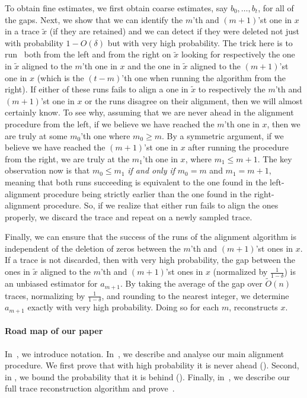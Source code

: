 \documentclass[12pt]{article}
\theoremstyle{definition}
\theoremstyle{remark}
\begin{document}
To obtain fine estimates, we first obtain coarse estimates, say $b_0,\dots, b_t$, for all of the gaps. Next, we show that we can identify the $m$'th and $(m+1)$'st one in $x$ in a trace $\tilde x$ (if they are retained) and we can detect if they were deleted not just with probability $1-O(\delta)$ but with very high probability. The trick here is to run~ both from the left and from the right on $\tilde x$ looking for respectively the one in $\tilde x$ aligned to the $m$'th one in $x$ and the one in $\tilde x$ aligned to the $(m+1)$'st one in $x$ (which is the $(t-m)$'th one when running the algorithm from the right). If either of these runs fails to align a one in $\tilde x$ to respectively the $m$'th and $(m+1)$'st one in $x$ or the runs disagree on their alignment,
then we will almost certainly know. To see why, assuming that we are never ahead in the alignment procedure from the left, if we believe we have reached the $m$'th one in $x$, then we are truly at some $m_0$'th one where $m_0 \ge m$. By a symmetric argument, if we believe we have reached the $(m+1)$'st one in $x$ after running the procedure from the right, we are truly at the $m_1$'th one in $x$, where $m_1 \le m+1$. The key observation now is that $m_0 \le m_1$ \emph{if and only if} $m_0 = m$ and $m_1 = m+1$, meaning that both runs succeeding is equivalent to the one found in the left-alignment procedure being strictly earlier than the one found in the right-alignment procedure.
So, if we realize that either run fails to align the ones properly, we discard the trace and repeat on a newly sampled trace.



Finally, we can ensure that the success of the runs of the alignment algorithm is independent of the deletion of zeros between the $m$'th and $(m+1)$'st ones in $x$.  If a trace is not discarded, then with very high probability, the gap between the ones in $\tilde x$ aligned to the $m$'th and $(m+1)$'st ones in $x$ (normalized by $\frac{1}{1-\delta}$) is an unbiased estimator for $a_{m+1}$. By taking the average of the gap over $\tilde O(n)$ traces, normalizing by $\frac{1}{1-\delta}$, and rounding to the nearest integer, we determine $a_{m+1}$ exactly with very high probability. Doing so for each $m$, reconstructs $x$.





\paragraph{Road map of our paper}
In~, we introduce notation. In~, we describe and analyse our main alignment procedure. We first prove that with high probability it is never ahead (). Second, in , we bound the probability that it is behind (). Finally, in~, we describe our full trace reconstruction algorithm and prove~.
\end{document}
